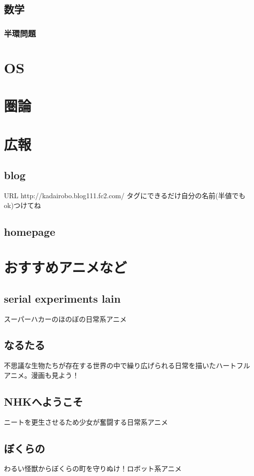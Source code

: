 \documentclass{jarticle}
\begin{document}
   \subsection{数学}
      \subsubsection{半環問題}
\clearpage

\section{OS}
\clearpage

\section{圏論}
\clearpage

\section{広報}
   \subsection{blog}
      URL http://kadairobo.blog111.fc2.com/
      タグにできるだけ自分の名前(半値でもok)つけてね
   \subsection{homepage}
\clearpage

\section{おすすめアニメなど}
   \subsection{serial experiments lain}
      スーパーハカーのほのぼの日常系アニメ
   \subsection{なるたる}
      不思議な生物たちが存在する世界の中で繰り広げられる日常を描いたハートフルアニメ。漫画も見よう！
   \subsection{NHKへようこそ}
      ニートを更生させるため少女が奮闘する日常系アニメ
   \subsection{ぼくらの}
      わるい怪獣からぼくらの町を守りぬけ！ロボット系アニメ
\end{document}
